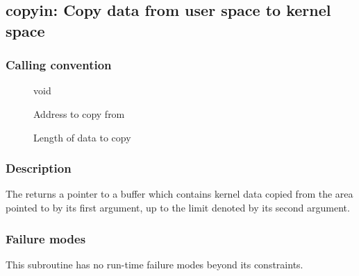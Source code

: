 \clearpage
{}
{}
\label{subr:copyin}
\subsection*{copyin: Copy data from user space to kernel space}

\subsubsection*{Calling convention}

\begin{description}
\item[] void
\item[] Address to copy from
\item[] Length of data to copy
\end{description}

\subsubsection*{Description}

The  returns a pointer to a buffer which contains
kernel data copied from the area pointed to by its first argument, up
to the limit denoted by its second argument.

\subsubsection*{Failure modes}

This subroutine has no run-time failure modes beyond its constraints.
